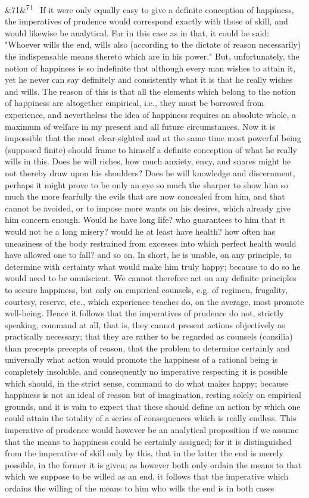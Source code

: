 \documentclass[12pt]{article}
\newcommand{\para}[1][]{\par\noindent\ifx&#1&\else\textsuperscript{\footnotesize #1}~\fi}
\begin{document}
\para[71] If it were only equally easy to give a definite conception of happiness, the imperatives of prudence would correspond exactly with those of skill, and would likewise be analytical. For in this case as in that, it could be said: "Whoever wills the end, wills also (according to the dictate of reason necessarily) the indispensable means thereto which are in his power." But, unfortunately, the notion of happiness is so indefinite that although every man wishes to attain it, yet he never can say definitely and consistently what it is that he really wishes and wills. The reason of this is that all the elements which belong to the notion of happiness are altogether empirical, i.e., they must be borrowed from experience, and nevertheless the idea of happiness requires an absolute whole, a maximum of welfare in my present and all future circumstances. Now it is impossible that the most clear-sighted and at the same time most powerful being (supposed finite) should frame to himself a definite conception of what he really wills in this. Does he will riches, how much anxiety, envy, and snares might he not thereby draw upon his shoulders? Does he will knowledge and discernment, perhaps it might prove to be only an eye so much the sharper to show him so much the more fearfully the evils that are now concealed from him, and that cannot be avoided, or to impose more wants on his desires, which already give him concern enough. Would he have long life? who guarantees to him that it would not be a long misery? would he at least have health? how often has uneasiness of the body restrained from excesses into which perfect health would have allowed one to fall? and so on. In short, he is unable, on any principle, to determine with certainty what would make him truly happy; because to do so he would need to be omniscient. We cannot therefore act on any definite principles to secure happiness, but only on empirical counsels, e.g. of regimen, frugality, courtesy, reserve, etc., which experience teaches do, on the average, most promote well-being. Hence it follows that the imperatives of prudence do not, strictly speaking, command at all, that is, they cannot present actions objectively as practically necessary; that they are rather to be regarded as counsels (consilia) than precepts precepts of reason, that the problem to determine certainly and universally what action would promote the happiness of a rational being is completely insoluble, and consequently no imperative respecting it is possible which should, in the strict sense, command to do what makes happy; because happiness is not an ideal of reason but of imagination, resting solely on empirical grounds, and it is vain to expect that these should define an action by which one could attain the totality of a series of consequences which is really endless. This imperative of prudence would however be an analytical proposition if we assume that the means to happiness could be certainly assigned; for it is distinguished from the imperative of skill only by this, that in the latter the end is merely possible, in the former it is given; as however both only ordain the means to that which we suppose to be willed as an end, it follows that the imperative which ordains the willing of the means to him who wills the end is in both cases 
\end{document}

